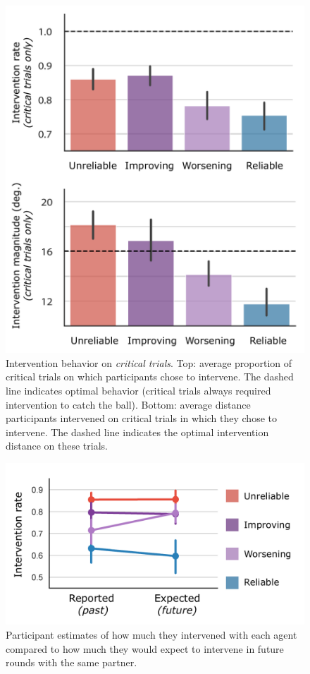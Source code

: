 \documentclass[10pt,letterpaper]{article}
\begin{document}
\begin{figure}[h]
\begin{center}
\includegraphics[width=0.9\linewidth]{img/critical_trial_intervention_summary_vert.pdf}
\end{center}
\caption{Intervention behavior on \textit{critical trials}. 
Top: average proportion of critical trials on which participants chose to intervene. The dashed line indicates optimal behavior (critical trials always required intervention to catch the ball). 
Bottom: average distance participants intervened on critical trials in which they chose to intervene. The dashed line indicates the optimal intervention distance on these trials.} 
\label{fig:critical_trials}
\end{figure}


\begin{figure}[htbp]
\begin{center}
\includegraphics[width=0.9\linewidth]{img/survey_intervention_expectations_clean.pdf}
\end{center}
\caption{Participant estimates of how much they intervened with each agent compared to how much they would expect to intervene in future rounds with the same partner.} 
\label{fig:survey}
\end{figure}
\end{document}
